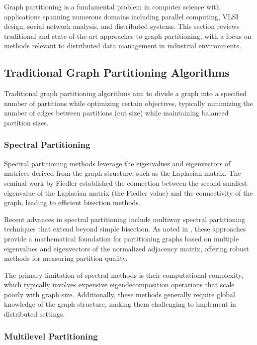 \documentclass{article}
\begin{document}
Graph partitioning is a fundamental problem in computer science with applications spanning numerous domains including parallel computing, VLSI design, social network analysis, and distributed systems. This section reviews traditional and state-of-the-art approaches to graph partitioning, with a focus on methods relevant to distributed data management in industrial environments.

\subsection{Traditional Graph Partitioning Algorithms}

Traditional graph partitioning algorithms aim to divide a graph into a specified number of partitions while optimizing certain objectives, typically minimizing the number of edges between partitions (cut size) while maintaining balanced partition sizes.

\subsubsection{Spectral Partitioning}

Spectral partitioning methods leverage the eigenvalues and eigenvectors of matrices derived from the graph structure, such as the Laplacian matrix. The seminal work by Fiedler \cite{fiedler1973algebraic} established the connection between the second smallest eigenvalue of the Laplacian matrix (the Fiedler value) and the connectivity of the graph, leading to efficient bisection methods.

Recent advances in spectral partitioning include multiway spectral partitioning techniques that extend beyond simple bisection. As noted in \cite{spectral2023}, these approaches provide a mathematical foundation for partitioning graphs based on multiple eigenvalues and eigenvectors of the normalized adjacency matrix, offering robust methods for measuring partition quality.

The primary limitation of spectral methods is their computational complexity, which typically involves expensive eigendecomposition operations that scale poorly with graph size. Additionally, these methods generally require global knowledge of the graph structure, making them challenging to implement in distributed settings.

\subsubsection{Multilevel Partitioning}
\end{document}
